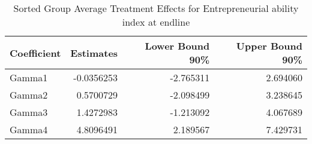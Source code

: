 \begin{table}

\caption{\label{tab:gatesQEntrep_total}Sorted Group Average Treatment Effects for Entrepreneurial ability index at endline}
\centering
\begin{tabular}[t]{lrrr}
\toprule
Coefficient & Estimates & Lower Bound 90\% & Upper Bound 90\%\\
\midrule
Gamma1 & -0.0356253 & -2.765311 & 2.694060\\
Gamma2 & 0.5700729 & -2.098499 & 3.238645\\
Gamma3 & 1.4272983 & -1.213092 & 4.067689\\
Gamma4 & 4.8096491 & 2.189567 & 7.429731\\
\bottomrule
\end{tabular}
\end{table}
